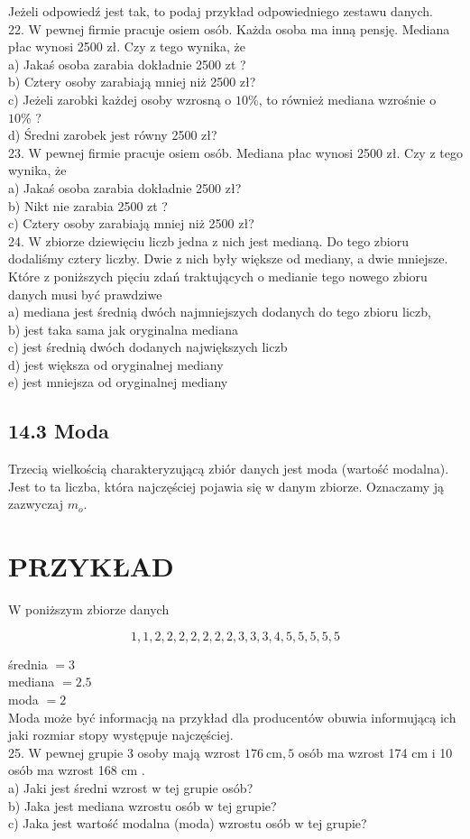 \documentclass[10pt]{article}
\begin{document}
Jeżeli odpowiedź jest tak, to podaj przykład odpowiedniego zestawu danych.\\
22. W pewnej firmie pracuje osiem osób. Każda osoba ma inną pensję. Mediana płac wynosi 2500 zł. Czy z tego wynika, że\\
a) Jakaś osoba zarabia dokładnie 2500 zt ?\\
b) Cztery osoby zarabiają mniej niż 2500 zł?\\
c) Jeżeli zarobki każdej osoby wzrosną o \(10 \%\), to również mediana wzrośnie o \(10 \%\) ?\\
d) Średni zarobek jest równy 2500 zł?\\
23. W pewnej firmie pracuje osiem osób. Mediana płac wynosi 2500 zł. Czy z tego wynika, że\\
a) Jakaś osoba zarabia dokładnie 2500 zł?\\
b) Nikt nie zarabia 2500 zt ?\\
c) Cztery osoby zarabiają mniej niż 2500 zł?\\
24. W zbiorze dziewięciu liczb jedna z nich jest medianą. Do tego zbioru dodaliśmy cztery liczby. Dwie z nich były większe od mediany, a dwie mniejsze. Które z poniższych pięciu zdań traktujących o medianie tego nowego zbioru danych musi być prawdziwe\\
a) mediana jest średnią dwóch najmniejszych dodanych do tego zbioru liczb,\\
b) jest taka sama jak oryginalna mediana\\
c) jest średnią dwóch dodanych największych liczb\\
d) jest większa od oryginalnej mediany\\
e) jest mniejsza od oryginalnej mediany

\subsection*{14.3 Moda}
Trzecią wielkością charakteryzującą zbiór danych jest moda (wartość modalna). Jest to ta liczba, która najczęściej pojawia się w danym zbiorze. Oznaczamy ją zazwyczaj \(m_{o}\).

\section*{PRZYKŁAD}
W poniższym zbiorze danych

\[
1,1,2,2,2,2,2,2,2,3,3,3,4,5,5,5,5,5
\]

średnia \(=3\)\\
mediana \(=2.5\)\\
moda \(=2\)\\
Moda może być informacją na przykład dla producentów obuwia informującą ich jaki rozmiar stopy występuje najczęściej.\\
25. W pewnej grupie 3 osoby mają wzrost \(176 \mathrm{~cm}, 5\) osób ma wzrost 174 cm i 10 osób ma wzrost 168 cm .\\
a) Jaki jest średni wzrost w tej grupie osób?\\
b) Jaka jest mediana wzrostu osób w tej grupie?\\
c) Jaka jest wartość modalna (moda) wzrostu osób w tej grupie?
\end{document}
